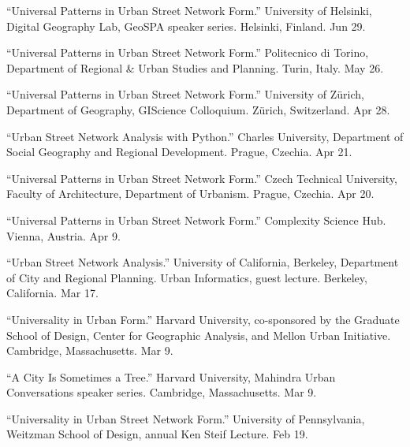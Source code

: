\documentclass[11pt,a4paper]{report} %
\begin{document}
\begin{tablist}

\item[2026] \tab{}\enquote{Universal Patterns in Urban Street Network Form.} University of Helsinki, Digital Geography Lab, GeoSPA speaker series. Helsinki, Finland. Jun 29.

\item[2026] \tab{}\enquote{Universal Patterns in Urban Street Network Form.} Politecnico di Torino, Department of Regional \& Urban Studies and Planning. Turin, Italy. May 26.

\item[2026] \tab{}\enquote{Universal Patterns in Urban Street Network Form.} University of Zürich, Department of Geography, GIScience Colloquium. Zürich, Switzerland. Apr 28.

\item[2026] \tab{}\enquote{Urban Street Network Analysis with Python.} Charles University, Department of Social Geography and Regional Development. Prague, Czechia. Apr 21.

\item[2026] \tab{}\enquote{Universal Patterns in Urban Street Network Form.} Czech Technical University, Faculty of Architecture, Department of Urbanism. Prague, Czechia. Apr 20.

\item[2026] \tab{}\enquote{Universal Patterns in Urban Street Network Form.} Complexity Science Hub. Vienna, Austria. Apr 9.

\item[2026] \tab{}\enquote{Urban Street Network Analysis.} University of California, Berkeley, Department of City and Regional Planning. Urban Informatics, guest lecture. Berkeley, California. Mar 17.

\item[2026] \tab{}\enquote{Universality in Urban Form.} Harvard University, co-sponsored by the Graduate School of Design, Center for Geographic Analysis, and Mellon Urban Initiative. Cambridge, Massachusetts. Mar 9.

\item[2026] \tab{}\enquote{A City Is Sometimes a Tree.} Harvard University, Mahindra Urban Conversations speaker series. Cambridge, Massachusetts. Mar 9.

\item[2026] \tab{}\enquote{Universality in Urban Street Network Form.} University of Pennsylvania, Weitzman School of Design, annual Ken Steif Lecture. Feb 19.


\end{tablist}
\end{document}
